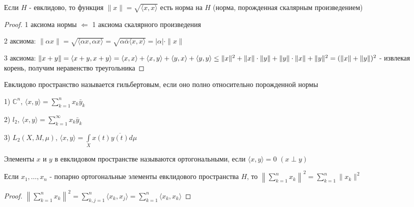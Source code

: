 \documentclass[a4paper,12pt]{report}
\newcommand*{\hm}[1]{#1\nobreak\discretionary{}%
            {\hbox{$\mathsurround=0pt #1$}}{}}
\begin{document}
\begin{cons}
Если $H$ - евклидово, то функция $\|x\|=\sqrt{\langle x,x\rangle}$ есть норма на $H$ (норма, порожденная скалярным произведением)
\end{cons}
\begin{proof}
1 аксиома нормы $\Leftarrow$ 1 аксиома скалярного произведения

2 аксиома: $\|\alpha x\|=\sqrt{\langle\alpha x,\alpha x\rangle}=\sqrt{\alpha\bar\alpha\langle x,x\rangle}=|\alpha|\cdot\|x\|$

3 аксиома: $\|x+y\|=\langle x+y,x+y\rangle=\langle x,x\rangle+\langle x,y\rangle+\langle y,x\rangle+\langle y,y\rangle\hm\le\|x\|^2+\|x\|\cdot\|y\|+\|y\|\cdot\|x\|+\|y\|^2=(\|x\|+\|y\|)^2$ - извлекая корень, получим неравенство треугольника
\end{proof}
 


\begin{df}
Евклидово пространство называется гильбертовым, если оно полно относительно порожденной нормы
\end{df}
 


\begin{ex}
1) $\mathbb C^n$, $\langle x,y\rangle=\sum\limits_{k=1}^n x_k\bar y_k$

2) $l_2$, $\langle x,y\rangle=\sum\limits_{k=1}^\infty x_k\bar y_k$

3) $L_2(X,M,\mu)$, $\langle x,y\rangle=\displaystyle\int\limits_X x(t)\overline{y(t)}d\mu$
\end{ex}
 


\begin{df}
Элементы $x$ и $y$ в евклидовом пространстве называются ортогональными, если $\langle x,y\rangle=0$ $(x\perp y)$
\end{df}
 


\begin{prop}
Если $x_1,\ldots,x_n$ - попарно ортогональные элементы евклидового пространства $H$, то $\left\|\sum\limits_{k=1}^n x_k\right\|^2=\sum\limits_{k=1}^n\|x_k\|^2$
\end{prop}
\begin{proof}
$\left\|\sum\limits_{k=1}^n x_k\right\|^2=\sum\limits_{k,j=1}^n\langle x_k,x_j\rangle=\sum\limits_{k=1}^n\langle x_k,x_k\rangle$
\end{proof}
 
\end{document}
